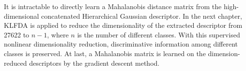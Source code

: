 It is intractable to directly learn a Mahalanobis distance matrix from the high-dimensional concatenated Hierarchical Gaussian descriptor. In the next chapter, KLFDA is applied to reduce the dimensionality of the extracted descriptor from 27622 to $n-1$, where $n$ is the number of different classes. With this supervised nonlinear dimensionality reduction, discriminative information among different classes is preserved. At last, a Mahalanobis matrix is learned on the dimension-reduced descriptors by the gradient descent method.




%
